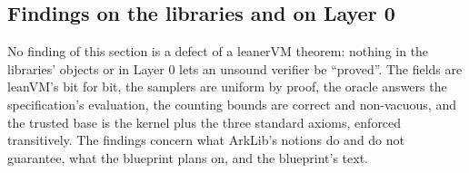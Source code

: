 \begingroup\sloppy
\subsection{Findings on the libraries and on Layer 0}\label{sec:gen-lib-findings}

No finding of this section is a defect of a leanerVM theorem: nothing in the libraries' objects or
in Layer 0 lets an unsound verifier be \enquote{proved}. The fields are leanVM's bit for bit, the
samplers are uniform by proof, the oracle answers the specification's evaluation, the counting
bounds are correct and non-vacuous, and the trusted base is the kernel plus the three standard
axioms, enforced transitively. The findings concern what ArkLib's notions do and do not guarantee,
what the blueprint plans on, and the blueprint's text.

